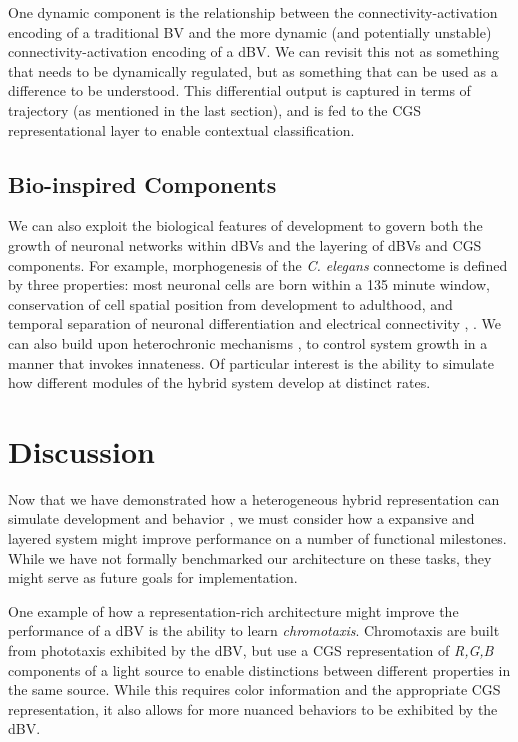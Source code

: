 \documentclass[letterpaper]{article}
\begin{document}
One dynamic component is the relationship between the connectivity-activation encoding of a traditional BV and the more dynamic (and potentially unstable) connectivity-activation encoding of a dBV. We can revisit this not as something that needs to be dynamically regulated, but as something that can be used as a difference to be understood. This differential output is captured in terms of trajectory (as mentioned in the last section), and is fed to the CGS representational layer to enable contextual classification. 

\subsection{Bio-inspired Components}
We can also exploit the biological features of development to govern both the growth of neuronal networks within dBVs and the layering of dBVs and CGS components. For example, morphogenesis of the \textit{C. elegans} connectome is defined by three properties: most neuronal cells are born within a 135 minute window, conservation of cell spatial position from development to adulthood, and temporal separation of neuronal differentiation and electrical connectivity \citep{[15]}, \citep{[16]}. We can also build upon heterochronic mechanisms \citep{[17]}, \citep{[18]} to control system growth in a manner that invokes innateness. Of particular interest is the ability to simulate how different modules of the hybrid system develop at distinct rates.

\section{Discussion}
Now that we have demonstrated how a heterogeneous hybrid representation can simulate development and behavior \citep{[19]}, we must consider how a expansive and layered system might improve performance on a number of functional milestones. While we have not formally benchmarked our architecture on these tasks, they might serve as future goals for implementation.

One example of how a representation-rich architecture might improve the performance of a dBV is the ability to learn \textit{chromotaxis}. Chromotaxis are built from phototaxis exhibited by the dBV, but use a CGS representation of \textit{R,G,B} components of a light source to enable distinctions between different properties in the same source. While this requires color information and the appropriate CGS representation, it also allows for more nuanced behaviors to be exhibited by the dBV.
\end{document}
